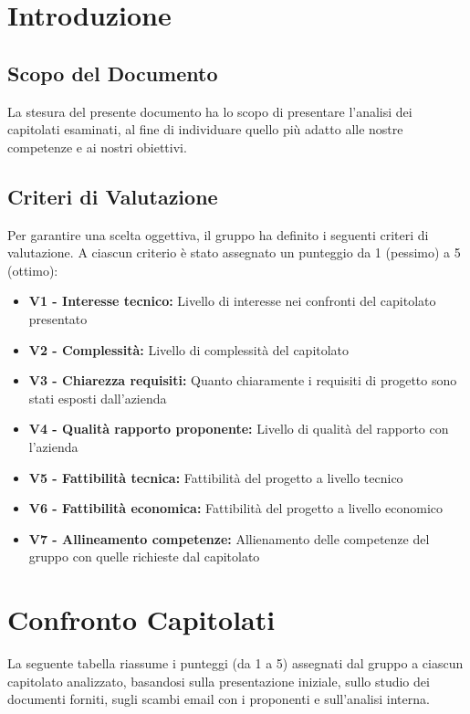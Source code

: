 \section{Introduzione}

\subsection{Scopo del Documento}
La stesura del presente documento ha lo scopo di presentare l'analisi dei capitolati esaminati, al fine di individuare quello più adatto alle nostre competenze e ai nostri obiettivi.

\subsection{Criteri di Valutazione}
Per garantire una scelta oggettiva, il gruppo ha definito i seguenti criteri di valutazione. A ciascun criterio è stato assegnato un punteggio da 1 (pessimo) a 5 (ottimo):
\begin{itemize}
	\item \textbf{V1 - Interesse tecnico:} {Livello di interesse nei confronti del capitolato presentato}
	\item \textbf{V2 - Complessità:} {Livello di complessità del capitolato}
	\item \textbf{V3 - Chiarezza requisiti:} {Quanto chiaramente i requisiti di progetto sono stati esposti dall'azienda}
	\item \textbf{V4 - Qualità rapporto proponente:} {Livello di qualità del rapporto con l'azienda}
	\item \textbf{V5 - Fattibilità tecnica:} {Fattibilità del progetto a livello tecnico}
	\item \textbf{V6 - Fattibilità economica:} {Fattibilità del progetto a livello economico}
	\item \textbf{V7 - Allineamento competenze:} {Allienamento delle competenze del gruppo con quelle richieste dal capitolato}
\end{itemize}

\newpage
\section{Confronto Capitolati}
La seguente tabella riassume i punteggi (da 1 a 5) assegnati dal gruppo a ciascun capitolato analizzato, basandosi sulla presentazione iniziale, sullo studio dei documenti forniti, sugli scambi email con i proponenti e sull'analisi interna.

